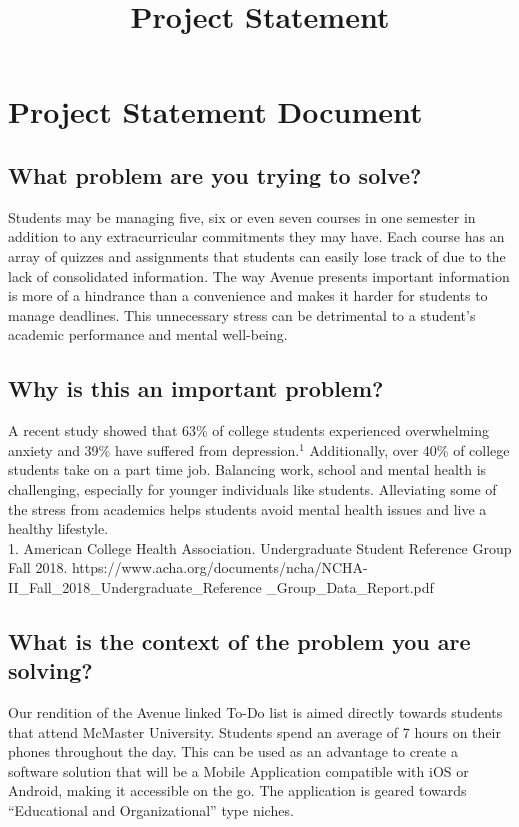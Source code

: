 \documentclass[11pt, oneside]{article}   	%
\title{Project Statement}
\author{}
\begin{document}
\marginpar{}
\section*{Project Statement Document}
\subsection{What problem are you trying to solve?}

Students may be managing five, six or even seven courses in one semester in addition to any extracurricular commitments they may have. Each course has an array of quizzes and assignments that students can easily lose track of due to the lack of consolidated information. The way Avenue presents important information is more of a hindrance than a convenience and makes it harder for students to manage deadlines. This unnecessary stress can be detrimental to a student's academic performance and mental well-being.

\subsection{Why is this an important problem?}

A recent study showed that 63\% of college students experienced overwhelming anxiety and 39\% have suffered from depression.$^1$ Additionally, over 40\% of college students take on a part time job. Balancing work, school and mental health is challenging, especially for younger individuals like students. Alleviating some of the stress from academics helps students avoid mental health issues and live a healthy lifestyle.\\

1. American College Health Association. Undergraduate Student Reference Group Fall 2018. https://www.acha.org/documents/ncha/NCHA-II\_Fall\_2018\_Undergraduate\_Reference \_Group\_Data\_Report.pdf 


\subsection{What is the context of the problem you are solving?}

Our rendition of the Avenue linked To-Do list is aimed directly towards students that attend McMaster University. Students spend an average of 7 hours on their phones throughout the day. This can be used as an advantage to create a software solution that will be a Mobile Application compatible with iOS or Android, making it accessible on the go. The application is geared towards “Educational and Organizational” type niches.
\end{document}
